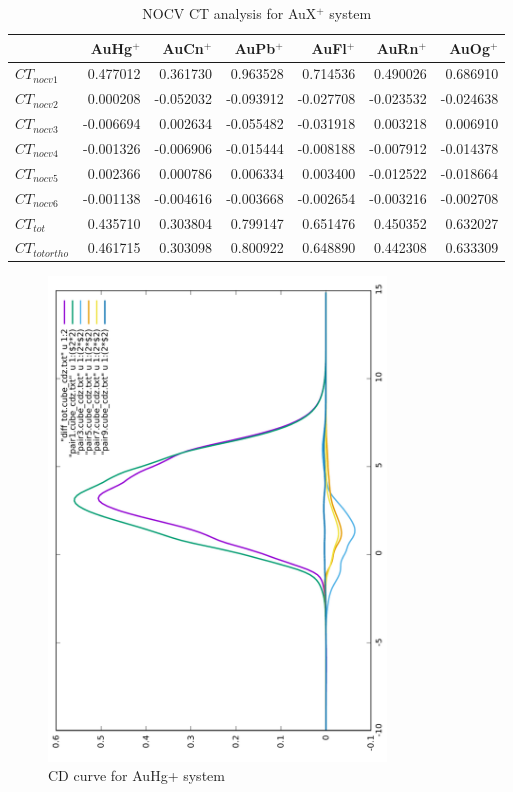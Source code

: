 \documentclass[journal=inoraj,manuscript=article]{achemso}
\begin{document}
\begin{table}[!h]
\begin{tabular}{lrrrrrr}
\hline
                 & AuHg$^+$  & AuCn$^+$  & AuPb$^+$  & AuFl$^+$  & AuRn$^+$  & AuOg$^+$ \\ \hline
\hline
$CT_{nocv1}$     &  0.477012 &  0.361730 &  0.963528 &  0.714536 &  0.490026 &  0.686910 \\ \hline
$CT_{nocv2}$     &  0.000208 & -0.052032 & -0.093912 & -0.027708 & -0.023532 & -0.024638 \\ \hline
$CT_{nocv3}$     & -0.006694 &  0.002634 & -0.055482 & -0.031918 &  0.003218 &  0.006910 \\ \hline
$CT_{nocv4}$     & -0.001326 & -0.006906 & -0.015444 & -0.008188 & -0.007912 & -0.014378 \\ \hline
$CT_{nocv5}$     &  0.002366 &  0.000786 &  0.006334 &  0.003400 & -0.012522 & -0.018664 \\ \hline
$CT_{nocv6}$     & -0.001138 & -0.004616 & -0.003668 & -0.002654 & -0.003216 & -0.002708 \\ \hline
$CT_{tot}$       &  0.435710 &  0.303804 &  0.799147 &  0.651476 &  0.450352 &  0.632027 \\ \hline
$CT_{tot ortho}$ &  0.461715 &  0.303098 &  0.800922 &  0.648890 &  0.442308 &  0.633309 \\ \hline
\end{tabular}
\caption{NOCV CT analysis for AuX$^+$ system}
\end{table}



\begin{figure}[!h]
\includegraphics[angle=-90,width=0.80\textwidth]{./AuHg+/cd.pdf}
\caption{CD curve for AuHg+ system}
\end{figure}
\end{document}
